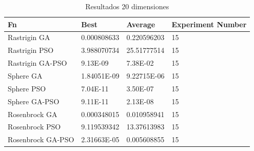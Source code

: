 \documentclass[runningheads]{llncs}
\begin{document}
      

                  \begin{table}[htp]

    \caption{Resultados 20 dimensiones}
    \label{table:resultados-2}
    \centering
    \begin{tabular}{|l|l|l|l|}
    \hline
    Fn & Best & Average & Experiment Number \\
    \hline
    \hline
    Rastrigin GA & 0.000808633 & 0.220596203 & 15\\
    \hline
    Rastrigin PSO & 3.988070734 & 25.51777514 & 15\\
    \hline
    Rastrigin GA-PSO & 9.13E-09 & 7.38E-02 & 15\\
    \hline
    Sphere GA & 1.84051E-09 & 9.22715E-06 & 15\\
    \hline
    Sphere PSO & 7.04E-11 & 3.50E-07 & 15\\
    \hline
    Sphere GA-PSO & 9.11E-11 & 2.13E-08 & 15\\
    \hline
    Rosenbrock GA & 0.000348015 & 0.010958941 & 15\\
    \hline
    Rosenbrock PSO & 9.119539342 & 13.37613983 & 15\\
    \hline
    Rosenbrock GA-PSO & 2.31663E-05 & 0.005608855 & 15\\
    \hline
    \end{tabular}
    \end{table}
\end{document}
